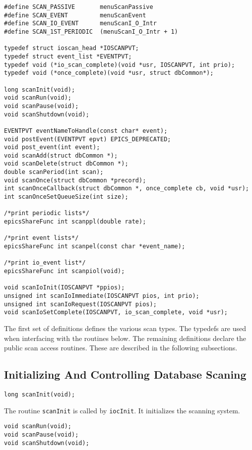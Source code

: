 \begin{verbatim}
#define SCAN_PASSIVE       menuScanPassive
#define SCAN_EVENT         menuScanEvent
#define SCAN_IO_EVENT      menuScanI_O_Intr
#define SCAN_1ST_PERIODIC  (menuScanI_O_Intr + 1)

typedef struct ioscan_head *IOSCANPVT;
typedef struct event_list *EVENTPVT;
typedef void (*io_scan_complete)(void *usr, IOSCANPVT, int prio);
typedef void (*once_complete)(void *usr, struct dbCommon*);

long scanInit(void);
void scanRun(void);
void scanPause(void);
void scanShutdown(void);

EVENTPVT eventNameToHandle(const char* event);
void postEvent(EVENTPVT epvt) EPICS_DEPRECATED;
void post_event(int event);
void scanAdd(struct dbCommon *);
void scanDelete(struct dbCommon *);
double scanPeriod(int scan);
void scanOnce(struct dbCommon *precord);
int scanOnceCallback(struct dbCommon *, once_complete cb, void *usr);
int scanOnceSetQueueSize(int size);

/*print periodic lists*/
epicsShareFunc int scanppl(double rate);

/*print event lists*/
epicsShareFunc int scanpel(const char *event_name);

/*print io_event list*/
epicsShareFunc int scanpiol(void);

void scanIoInit(IOSCANPVT *ppios);
unsigned int scanIoImmediate(IOSCANPVT pios, int prio);
unsigned int scanIoRequest(IOSCANPVT pios);
void scanIoSetComplete(IOSCANPVT, io_scan_complete, void *usr);
\end{verbatim}

The first set of definitions defines the various scan types.
The typedefs are used when interfacing with the routines below.
The remaining definitions declare the public scan access routines.
These are described in the following subsections.

\subsection{Initializing And Controlling Database Scaning}

\begin{verbatim}
long scanInit(void);
\end{verbatim}

The routine \verb|scanInit| is called by \verb|iocInit|.
It initializes the scanning system.

\begin{verbatim}
void scanRun(void);
void scanPause(void);
void scanShutdown(void);
\end{verbatim}

